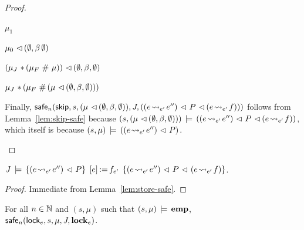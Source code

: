\documentclass[11pt]{report}
\begin{document}
\begin{proof}
\begin{enumerate}
{          $\mu_1$


          $\mu_0 \fseq (\nil,\beta\nil)$


          $(\mu_J \fsep (\mu_F \fhash \mu)) \fseq (\nil,\beta,\nil)$


          $\mu_J \fsep (\mu_F \fhash (\mu \fseq (\nil,\beta,\nil))) $

        }

         Finally, $\safe{n}{\cskip,s,(\mu \fseq (\nil,\beta,\nil)),J,((e \fwrite{e'} e'') \fseq P \fseq (e \fwrite{e'} f))}$ follows from Lemma~\ref{lem:skip-safe} because $(s,(\mu \fseq (\nil,\beta,\nil))) \sentails ((e \fwrite{e'} e'') \fseq P \fseq (e \fwrite{e'} f))$, which itself is because $(s,\mu) \sentails ((e \fwrite{e'} e'') \fseq P)$.  
    \end{enumerate}
\end{proof}

\begin{lemma}
    \label{lem:store-sound}
    $\truespec{J}{\left(e \fwrite{e'} e''\right) \fseq P}{\cstore{e}{f}_{e'}}{\left(e \fwrite{e'} e''\right) \fseq P \fseq \left(e \fwrite{e'} f\right)}$. 
\end{lemma} 

\begin{proof}
    Immediate from Lemma~\ref{lem:store-safe}. 
\end{proof}

\begin{lemma}
    \label{lem:lock-safe}
    For all $n \in \setnaturals$ and $(s,\mu)$ such that $(s,\mu) \sentails \femp$, \\ $\safe{n}{\clock_{e},s,\mu,J,\flock{e}}$. 
\end{lemma}
\end{document}
